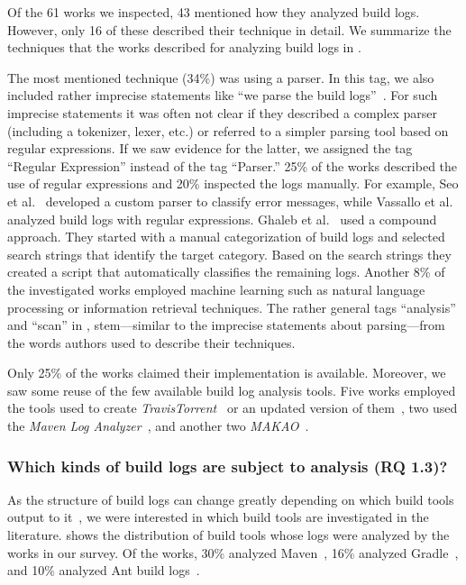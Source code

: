 \documentclass[10pt,journal,compsoc]{IEEEtran}
\begin{document}
Of the 61 works we inspected, 43 mentioned how they analyzed
build logs.
However, only 16 of these described their technique in detail.
We summarize the techniques that the works
described for analyzing build logs in .

The most mentioned technique (34\%) was using a parser.
In this tag, we also
included
rather imprecise statements like ``we parse the build
logs''~\cite{rahman2018impact}.
For such imprecise statements it was often not clear if they described
a complex parser (including a tokenizer, lexer, etc.) or referred to a
simpler parsing tool based on regular expressions.
If we saw evidence for the latter, we assigned the tag
``Regular Expression'' instead of the tag ``Parser.''
25\% of the works described the use of regular expressions and 20\%
inspected the logs manually.
For example,
Seo et al.~\cite{seo2014programmers} developed a custom
parser to classify error messages, while Vassallo et
al.~\cite{vassallo2017a-tale} analyzed build logs with regular
expressions.
Ghaleb et al.~\cite{ghaleb2019studying} used a compound approach.
They started with a manual categorization of build logs and selected
search strings that identify the target category.
Based on the search strings they created a script that automatically
classifies the remaining logs.
Another 8\% of the investigated works
employed machine learning such as natural language
processing or information retrieval techniques.
The rather general tags ``analysis'' and ``scan'' in
, stem---similar to the imprecise
statements about parsing---from the
words authors used to describe their techniques.


Only 25\% of the works claimed their implementation is available.
Moreover, we
saw some reuse of the few available build log analysis tools.
Five works employed the tools used to create
\emph{TravisTorrent}~\cite{beller2017oops,
orellana2017differences,zhao2018comparing} or
an updated version of them~\cite{rott2019empirische,
shi2018evaluating}, two used the
\emph{Maven Log Analyzer}~\cite{macho2018automatically,gallaba2018noise},
and
another two
\emph{MAKAO}~\cite{wen2018blimp,adams2007design}.

\subsubsection{Which kinds of build logs are subject to
  analysis (RQ 1.3)?}
As the structure of build logs can change greatly depending on which
build tools output to it~\cite{staahl2014modeling},
we were interested in which build tools are
investigated in the literature.
 shows the distribution of
build tools whose logs were analyzed by the works in our survey.
Of the works, 30\% analyzed
Maven~\cite{maven2019website},
16\% analyzed Gradle~\cite{gradle2020website},
and 10\% analyzed Ant build logs~\cite{ant2020website}.
\end{document}
